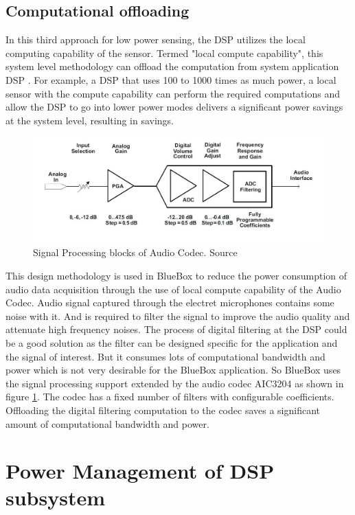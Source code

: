  \subsection{Computational offloading}
 In this third approach for low power sensing, the DSP utilizes the local computing capability of the sensor. Termed "local compute capability", this system level methodology can offload the computation from system application DSP . For example, a DSP that uses 100 to 1000 times as much power, a local sensor with the compute capability can perform the required computations and allow the DSP to go into lower power modes delivers a significant power savings at the system level, resulting in savings.  
 
  \begin{figure}[h]
 	\centering
 	\includegraphics[scale = 0.5 ]{AIC_processingBlock.JPG}
 	\caption{Signal Processing blocks of Audio Codec. Source \cite{audiocodec} \label{AIC_processingBlock}}
 \end{figure}
 
 This design methodology is used in BlueBox to reduce the power consumption of audio data acquisition through the use of local compute capability of the Audio Codec. Audio signal captured through the electret microphones contains some noise with it. And is required to filter the signal to improve the audio quality and attenuate high frequency noises. The process of digital filtering at the DSP could be a good solution as the filter can be designed specific for the application and the signal of interest. But it consumes lots of computational bandwidth and power which is not very desirable for the BlueBox application. So BlueBox uses the signal processing support extended by the audio codec AIC3204 as shown in figure \ref{AIC_processingBlock}. The codec has a fixed number of filters with configurable coefficients. Offloading the digital filtering computation to the codec saves a significant amount of computational bandwidth and power.
 
\section{Power Management of DSP subsystem }

